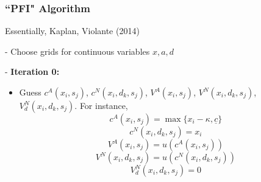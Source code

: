 \documentclass{beamer}
\begin{document}
\begin{frame}
  \frametitle{``PFI" Algorithm}

  Essentially, Kaplan, Violante (2014)
  \medskip

  \footnotesize
  - Choose grids for continuous variables $x, a, d$
  \medskip

  - \textbf{Iteration 0:}
  \begin{itemize}
    \item Guess $c^A(x_i, s_j)$, $c^N(x_i, d_k, s_j)$, $V^A(x_i, s_j)$, $V^N(x_i, d_k, s_j)$, $V_d^N(x_i, d_k, s_j)$. For instance,
    \begin{equation*}
      c^A(x_i, s_j) = \max\{x_i-\kappa,\underline{c}\}
    \end{equation*}
    \begin{equation*}
      c^N(x_i, d_k, s_j) = x_i
    \end{equation*}
    \begin{equation*}
      V^A(x_i, s_j) = u(c^A(x_i, s_j))
    \end{equation*}
    \begin{equation*}
      V^N(x_i, d_k, s_j) = u(c^N(x_i, d_k, s_j))
    \end{equation*}
    \begin{equation*}
      V_d^N(x_i, d_k, s_j)=0
    \end{equation*}
  \end{itemize}
\end{frame}
\end{document}
